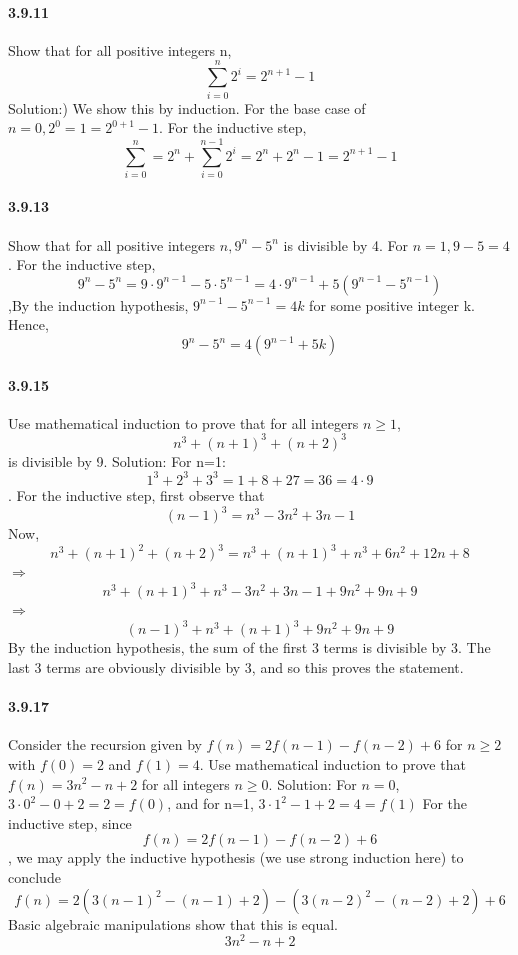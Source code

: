 \documentclass{article}
\begin{document}
\paragraph{3.9.11}
Show that for all positive integers n,
$$\sum_{i=0}^{n}2^i=2^{n+1}-1$$\newline
Solution:) We show this by induction. For the base case of $n=0,2^0=1=2^{0+1}-1$. For the inductive step,
$$\sum_{i=0}^{n}=2^n+\sum_{i=0}^{n-1}2^i=2^n+2^n-1=2^{n+1}-1$$
\paragraph{3.9.13}
Show that for all positive integers $n,9^n-5^n$ is divisible by 4.\newline
For $n=1,9-5=4$. For the inductive step,
$$9^n-5^n=9\cdot 9^{n-1}-5\cdot 5^{n-1}=4\cdot 9^{n-1}+5(9^{n-1}-5^{n-1})$$
,By the induction hypothesis, $9^{n-1}-5^{n-1}=4k$ for some positive integer k. Hence, $$9^n-5^n=4(9^{n-1}+5k)$$
\paragraph{3.9.15}Use mathematical induction to prove that for all integers $n\ge 1$,\newline
$$n^3+(n+1)^3+(n+2)^3$$ is divisible by 9.\newline
Solution:\newline
For n=1:
$$1^3+2^3+3^3=1+8+27=36=4\cdot 9$$
. For the inductive step, first observe that
$$(n-1)^3=n^3-3n^2+3n-1$$
Now,
$$n^3+(n+1)^2+(n+2)^3=n^3+(n+1)^3+n^3+6n^2+12n+8$$
$\Longrightarrow$
$$n^3+(n+1)^3+n^3-3n^2+3n-1+9n^2+9n+9$$
$\Longrightarrow$
$$(n-1)^3+n^3+(n+1)^3+9n^2+9n+9$$
By the induction hypothesis, the sum of the first 3 terms is divisible by 3. The last 3 terms
are obviously divisible by 3, and so this proves the statement.
\paragraph{3.9.17}Consider the recursion given by $f(n)=2f(n-1)-f(n-2)+6$ for $n \ge 2$ with $f(0)=2$ and $f(1)=4$. Use mathematical induction to prove that $f(n)=3n^2-n+2$ for all integers $n\ge 0$.\newline
Solution:\newline
For $n=0$,$3\cdot 0^2-0+2=2=f(0)$, and for n=1, $3\cdot 1^2-1+2=4=f(1)$
For the inductive step, since
$$f(n)= 2f(n - 1) - f(n - 2) + 6$$,
we may apply the inductive hypothesis (we use strong induction here) to conclude
$$f(n)=2(3(n-1)^2-(n-1)+2)-(3(n-2)^2-(n-2)+2)+6$$
Basic algebraic manipulations show that this is equal.\newline
$$3n^2-n+2$$
\end{document}
